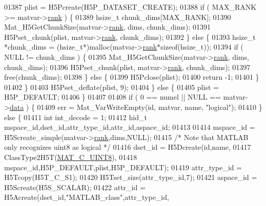 \begin{DoxyCode}
{{01387         plist = H5Pcreate(H5P\_DATASET\_CREATE);
01388         \textcolor{keywordflow}{if} ( MAX\_RANK >= matvar->\hyperlink{group___m_a_t_a84ba70c96ded13cc555fa75b768d9921}{rank} ) \{
01389             hsize\_t chunk\_dims[MAX\_RANK];
01390             Mat\_H5GetChunkSize(matvar->\hyperlink{group___m_a_t_a84ba70c96ded13cc555fa75b768d9921}{rank}, dims, chunk\_dims);
01391             H5Pset\_chunk(plist, matvar->\hyperlink{group___m_a_t_a84ba70c96ded13cc555fa75b768d9921}{rank}, chunk\_dims);
01392         \} \textcolor{keywordflow}{else} \{
01393             hsize\_t *chunk\_dims = (hsize\_t*)malloc(matvar->\hyperlink{group___m_a_t_a84ba70c96ded13cc555fa75b768d9921}{rank}*\textcolor{keyword}{sizeof}(hsize\_t));
01394             \textcolor{keywordflow}{if} ( NULL != chunk\_dims ) \{
01395                 Mat\_H5GetChunkSize(matvar->\hyperlink{group___m_a_t_a84ba70c96ded13cc555fa75b768d9921}{rank}, dims, chunk\_dims);
01396                 H5Pset\_chunk(plist, matvar->\hyperlink{group___m_a_t_a84ba70c96ded13cc555fa75b768d9921}{rank}, chunk\_dims);
01397                 free(chunk\_dims);
01398             \} \textcolor{keywordflow}{else} \{
01399                 H5Pclose(plist);
01400                 \textcolor{keywordflow}{return} -1;
01401             \}
01402         \}
01403         H5Pset\_deflate(plist, 9);
01404     \} \textcolor{keywordflow}{else} \{
01405         plist = H5P\_DEFAULT;
01406     \}
01407 
01408     \textcolor{keywordflow}{if} ( 0 == numel || NULL == matvar->\hyperlink{group___m_a_t_a5672978efa230bbdecdf38ede781f7fa}{data} ) \{
01409         err = Mat\_VarWriteEmpty(\textcolor{keywordtype}{id}, matvar, name, \textcolor{stringliteral}{"logical"});
01410     \} \textcolor{keywordflow}{else} \{
01411         \textcolor{keywordtype}{int}   int\_decode = 1;
01412         hid\_t mspace\_id,dset\_id,attr\_type\_id,attr\_id,aspace\_id;
01413 
01414         mspace\_id = H5Screate\_simple(matvar->\hyperlink{group___m_a_t_a84ba70c96ded13cc555fa75b768d9921}{rank},dims,NULL);
01415         \textcolor{comment}{/* Note that MATLAB only recognizes uint8 as logical */}
01416         dset\_id = H5Dcreate(\textcolor{keywordtype}{id},name,
01417                             ClassType2H5T(\hyperlink{group___m_a_t_ggad4d60ae7b709fc81bfd744fb4c857c40a81270f8093cb4808e992c1d29d84d4e3}{MAT\_C\_UINT8}),
01418                             mspace\_id,H5P\_DEFAULT,plist,H5P\_DEFAULT);
01419         attr\_type\_id = H5Tcopy(H5T\_C\_S1);
01420         H5Tset\_size(attr\_type\_id,7);
01421         aspace\_id = H5Screate(H5S\_SCALAR);
01422         attr\_id = H5Acreate(dset\_id,\textcolor{stringliteral}{"MATLAB\_class"},attr\_type\_id,
}}
\end{DoxyCode}
